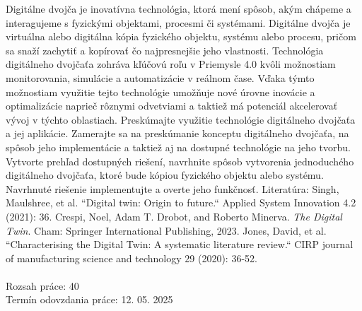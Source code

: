 \documentclass[12pt,a4paper]{article}
\begin{document}
\noindent
Digitálne dvojča je inovatívna technológia, ktorá mení spôsob, akým chápeme a interagujeme s fyzickými objektami, procesmi či systémami. Digitálne dvojča je virtuálna alebo digitálna kópia fyzického objektu, systému alebo procesu, pričom sa snaží zachytiť a kopírovať čo najpresnejšie jeho vlastnosti. Technológia digitálneho dvojčaťa zohráva kľúčovú roľu v Priemysle 4.0 kvôli možnostiam monitorovania, simulácie a automatizácie v reálnom čase. Vďaka týmto možnostiam využitie tejto technológie umožňuje nové úrovne inovácie a optimalizácie naprieč rôznymi odvetviami a taktiež má potenciál akcelerovať vývoj v týchto oblastiach. Preskúmajte využitie technológie digitálneho dvojčaťa a jej aplikácie. Zamerajte sa na preskúmanie konceptu digitálneho dvojčaťa, na spôsob jeho implementácie a taktiež aj na dostupné technológie na jeho tvorbu. Vytvorte prehľad dostupných riešení, navrhnite spôsob vytvorenia jednoduchého digitálneho dvojčaťa, ktoré bude kópiou fyzického objektu alebo systému. Navrhnuté riešenie implementujte a overte jeho funkčnosť. Literatúra: Singh, Maulshree, et al. “Digital twin: Origin to future.“ Applied System Innovation 4.2 (2021): 36. Crespi, Noel, Adam T. Drobot, and Roberto Minerva. \textit{The Digital Twin}. Cham: Springer International Publishing, 2023. Jones, David, et al. “Characterising the Digital Twin: A systematic literature review.“ CIRP journal of manufacturing science and technology 29 (2020): 36-52.\\
\\
{Rozsah práce:} 40 \\
{Termín odovzdania práce:} 12. 05. 2025
\end{document}
